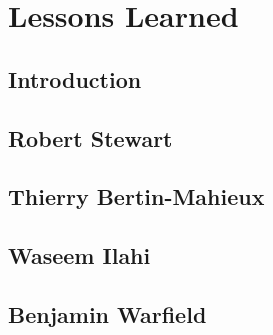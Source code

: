 
\chapter{Lessons Learned}


\section{Introduction}



\section{Robert Stewart}


\section{Thierry Bertin-Mahieux}


\section{Waseem Ilahi}


\section{Benjamin Warfield}


